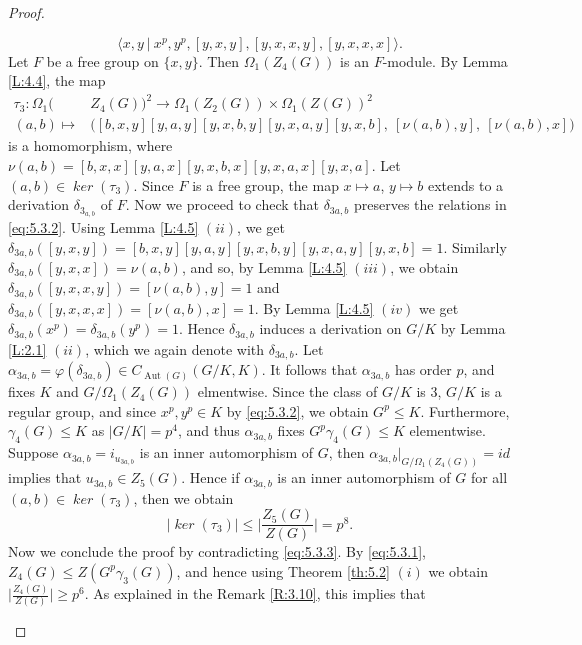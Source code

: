 \documentclass[preprint,sort&compress,12pt]{elsarticle}
\theoremstyle{definition}
\numberwithin{equation}{theorem}
\DeclareMathOperator{\Aut}{\operatorname{Aut}}
\DeclareMathOperator{\Ker}{\mathit{ker}}
\begin{document}
\begin{proof}
\begin{itemize}
\begin{equation}\label{eq:5.3.2}
\langle x, y\ |\ x^p, y^p, [y, x, y], [y, x, x, y], [y, x, x, x]\rangle.
\end{equation}
\noindent Let $F$ be a free group on $\{x, y\}$. Then $\Omega_1(Z_4(G))$ is an $F$-module. By Lemma \ref{L:4.4}, the map 
\begin{align*}
\tau_3: \Omega_1(&Z_4(G))^2\rightarrow \Omega_1(Z_2(G))\times \Omega_1(Z(G))^2\\
(a, b)\mapsto &\big([b, x, y][y, a, y][y, x, b, y][y, x, a, y][y, x, b],\ [\nu(a, b), y],\ [\nu(a, b), x]\big)
\end{align*}
is a homomorphism, where $\nu(a, b)= [b, x, x][y, a, x][y, x, b, x][y, x, a, x][y, x, a]$. Let $(a, b)\in \Ker(\tau_3)$. Since $F$ is a free group, the map $x\mapsto a$, $y\mapsto b$ extends to a derivation $\delta_{3_{a, b}}$ of $F$. Now we proceed to check that $\delta_{3 a, b}$ preserves the relations in \eqref{eq:5.3.2}. Using Lemma \ref{L:4.5} $(ii)$, we get $\delta_{3 a, b}([y, x, y])= [b, x, y][y, a, y][y, x, b, y][y, x, a, y][y, x, b]=1$. Similarly $\delta_{3 a, b}([y, x, x])= \nu(a, b)$, and so, by Lemma \ref{L:4.5} $(iii)$, we obtain $\delta_{3 a, b}([y, x, x, y])= [\nu(a, b), y]=1$ and $\delta_{3 a, b}([y, x, x, x])= [\nu(a, b), x]=1$. By Lemma \ref{L:4.5} $(iv)$ we get $\delta_{3 a, b}(x^p)= \delta_{3 a, b}(y^p)=1$. Hence $\delta_{3 a, b}$ induces a derivation on $G/K$ by Lemma \ref{L:2.1} $(ii)$, which we again denote with $\delta_{3 a, b}$. Let $\alpha_{3 a, b}=\varphi(\delta_{3 a, b})\in C_{\Aut(G)}(G/K, K)$. It follows that $\alpha_{3 a, b}$ has order $p$, and fixes $K$ and $G/\Omega_1(Z_4(G))$ elmentwise. Since the class of $G/K$ is $3$, $G/K$ is a regular group, and since $x^p, y^p\in K$ by \eqref{eq:5.3.2}, we obtain $G^p\le K$. Furthermore, $\gamma_4(G)\le K$ as $|G/K|=p^4$, and thus $\alpha_{3 a, b}$ fixes $G^p\gamma_4(G)\le K$ elementwise. Suppose $\alpha_{3 a, b}=i_{u_{3 a, b}}$ is an inner automorphism of $G$, then $\alpha_{3 a, b}|_{G/\Omega_1(Z_4(G))}=id$ implies that $u_{3 a, b}\in Z_5(G)$. Hence if $\alpha_{3 a, b}$ is an inner automorphism of $G$ for all $(a, b)\in \Ker(\tau_3)$, then we obtain
\begin{equation}\label{eq:5.3.3}
|\Ker(\tau_3)|\le \bigg|\frac{Z_5(G)}{Z(G)}\bigg|=p^8.
\end{equation}
Now we conclude the proof by contradicting \eqref{eq:5.3.3}. By \eqref{eq:5.3.1}, $Z_4(G)\le Z(G^p\gamma_3(G))$, and hence using Theorem \ref{th:5.2} $(i)$ we obtain $\big|\frac{Z_4(G)}{Z(G)}\big|\ge p^6$. As explained in the Remark \ref{R:3.10}, this implies that

\end{itemize}
\end{proof}
\end{document}
